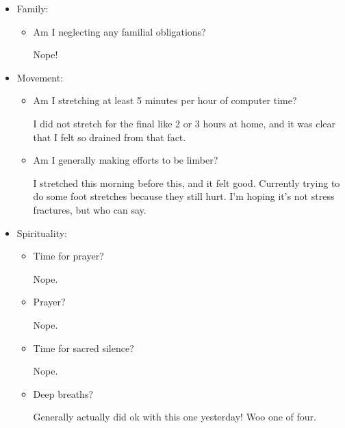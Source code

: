\documentclass[12pt]{article}
\renewcommand{\,}{\textsuperscript{,}}
\begin{document}
\begin{enumerate}
\begin{itemize}
\begin{itemize}
Yesterday I did! Had pizza.

\item Water?

Nowhere near enough. My water bottle is nearly empty, so I really should\footnote{want to and am working up the motivation to} refill it.

\end{itemize}

\item Family:

\begin{itemize}

\item Am I neglecting any familial obligations?

Nope!

\end{itemize}

\item Movement:

\begin{itemize}

\item Am I stretching at least 5 minutes per hour of computer time?

I did not stretch for the final like 2 or 3 hours at home, and it was clear that I felt so drained from that fact.

\item Am I generally making efforts to be limber?

I stretched this morning before this, and it felt good. Currently trying to do some foot stretches because they still hurt. I'm hoping it's not stress fractures, but who can say.

\end{itemize}

\item Spirituality:

\begin{itemize}

\item Time for prayer?

Nope.

\item Prayer?

Nope.

\item Time for sacred silence?

Nope.

\item Deep breaths?

Generally actually did ok with this one yesterday! Woo one of four.


\end{itemize}
\end{itemize}
\end{enumerate}
\end{document}
